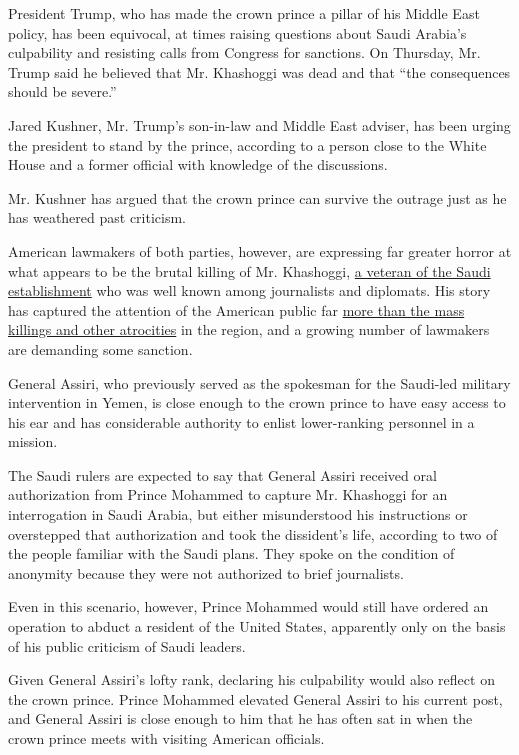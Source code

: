 President Trump, who has made the crown prince a pillar of his Middle
East policy, has been equivocal, at times raising questions about Saudi
Arabia's culpability and resisting calls from Congress for sanctions. On
Thursday, Mr. Trump said he believed that Mr. Khashoggi was dead and
that ``the consequences should be severe.''

Jared Kushner, Mr. Trump's son-in-law and Middle East adviser, has been
urging the president to stand by the prince, according to a person close
to the White House and a former official with knowledge of the
discussions.

Mr. Kushner has argued that the crown prince can survive the outrage
just as he has weathered past criticism.

American lawmakers of both parties, however, are expressing far greater
horror at what appears to be the brutal killing of Mr. Khashoggi,
\href{https://www.nytimes.com/2018/10/14/world/middleeast/jamal-khashoggi-saudi-arabia.html}{a
veteran of the Saudi establishment} who was well known among journalists
and diplomats. His story has captured the attention of the American
public far
\href{https://www.nytimes.com/2018/10/17/world/middleeast/jamal-khashoggi-saudi-arabia.html}{more
than the mass killings and other atrocities} in the region, and a
growing number of lawmakers are demanding some sanction.

General Assiri, who previously served as the spokesman for the Saudi-led
military intervention in Yemen, is close enough to the crown prince to
have easy access to his ear and has considerable authority to enlist
lower-ranking personnel in a mission.

The Saudi rulers are expected to say that General Assiri received oral
authorization from Prince Mohammed to capture Mr. Khashoggi for an
interrogation in Saudi Arabia, but either misunderstood his instructions
or overstepped that authorization and took the dissident's life,
according to two of the people familiar with the Saudi plans. They spoke
on the condition of anonymity because they were not authorized to brief
journalists.

Even in this scenario, however, Prince Mohammed would still have ordered
an operation to abduct a resident of the United States, apparently only
on the basis of his public criticism of Saudi leaders.

Given General Assiri's lofty rank, declaring his culpability would also
reflect on the crown prince. Prince Mohammed elevated General Assiri to
his current post, and General Assiri is close enough to him that he has
often sat in when the crown prince meets with visiting American
officials.

